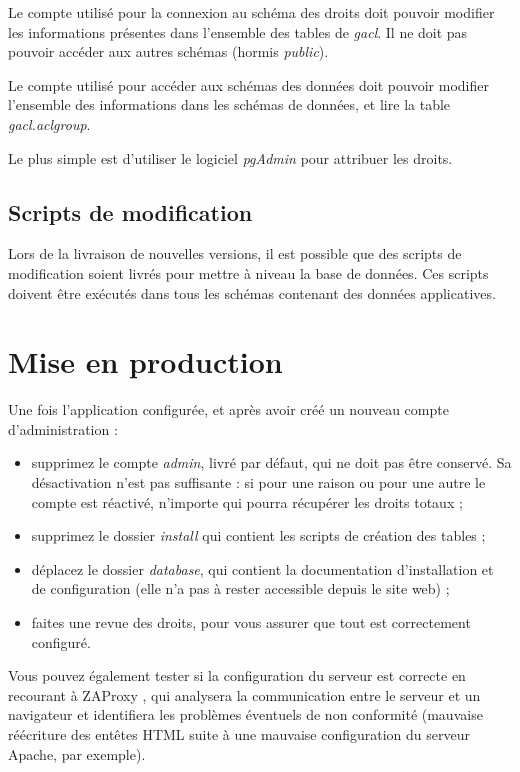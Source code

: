 Le compte utilisé pour la connexion au schéma des droits doit pouvoir modifier les informations présentes dans l'ensemble des tables de \textit{gacl}. Il ne doit pas pouvoir accéder aux autres schémas (hormis \textit{public}).

Le compte utilisé pour accéder aux schémas des données doit pouvoir modifier l'ensemble des informations dans les schémas de données, et lire la table \textit{gacl.aclgroup}.

Le plus simple est d'utiliser le logiciel \textit{pgAdmin} pour attribuer les droits.

\subsection{Scripts de modification}

Lors de la livraison de nouvelles versions, il est possible que des scripts de modification soient livrés pour mettre à niveau la base de données. Ces scripts doivent être exécutés dans tous les schémas contenant des données applicatives.

\section{Mise en production}

Une fois l'application configurée, et après avoir créé un nouveau compte d'administration :
\begin{itemize}
\item supprimez le compte \textit{admin}, livré par défaut, qui ne doit pas être conservé. Sa désactivation n'est pas suffisante : si pour une raison ou pour une autre le compte est réactivé, n'importe qui pourra récupérer les droits totaux ;
\item supprimez le dossier \textit{install} qui contient les scripts de création des tables ;
\item déplacez le dossier \textit{database}, qui contient la documentation d'installation et de configuration (elle n'a pas à rester accessible depuis le site web) ;
\item faites une revue des droits, pour vous assurer que tout est correctement configuré.
\end{itemize}

Vous pouvez également tester si la configuration du serveur est correcte en recourant à ZAProxy \cite{zaproxy}, qui analysera la communication entre le serveur et un navigateur et identifiera les problèmes éventuels de non conformité (mauvaise réécriture des entêtes HTML suite à une mauvaise configuration du serveur Apache, par exemple).